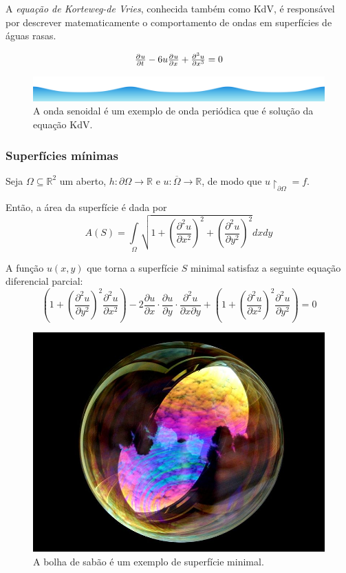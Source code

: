 \documentclass[11pt,twoside,a4paper]{book}
\begin{document}
A \emph{equação de Korteweg-de Vries}, conhecida também como KdV, é responsável por descrever matematicamente o comportamento de ondas em superfícies de águas rasas.


\[
\pd{u}{t} - 6 u \pd{u}{x} + \pd[3]{u}{x} = 0
\]

\begin{figure}[!ht]
    \centering
    \includegraphics[width=.40\textwidth]{figuras/onda_cnoidal.png}
    \caption{A onda senoidal é um exemplo de onda periódica que é solução da equação KdV.}
    \label{fig:onda_cnoidal}
\end{figure}


\subsubsection{Superfícies mínimas}

Seja $\Omega \subseteq \mathbb{R}^2$ um aberto, $h \colon \partial \Omega \to \mathbb{R}$ e $u \colon \overline{\Omega} \to \mathbb{R}$, de modo que $u \upharpoonright_{\partial \Omega} = f$.

\noindent
Então, a área da superfície é dada por
\[
A(S) = \int\limits_{\Omega} \sqrt{1 + \left(\frac{\partial^2 u}{\partial x^2}\right)^2 + \left(\frac{\partial^2 u}{\partial y^2}\right)^2} dx dy
\]

\noindent
A função $u(x,y)$ que torna a superfície $S$ minimal satisfaz a seguinte equação diferencial parcial:
\[
\left(1 + \left(\frac{\partial^2 u}{\partial y^2} \right)^2 \frac{\partial^2 u}{\partial x^2} \right) - 2 \frac{\partial u}{\partial x} \cdot \frac{\partial u}{\partial y} \cdot \frac{\partial^2 u}{\partial x \partial y} + \left(1 + \left(\frac{\partial^2 u}{\partial x^2} \right)^2 \frac{\partial^2 u}{\partial y^2} \right) = 0 
\]
\begin{figure}[!ht]
    \centering
    \includegraphics[width=.40\textwidth]{figuras/bolha_sabao.png}
    \caption{A bolha de sabão é um exemplo de superfície minimal.}
    \label{fig:bolha_sabao}
\end{figure}
\end{document}
